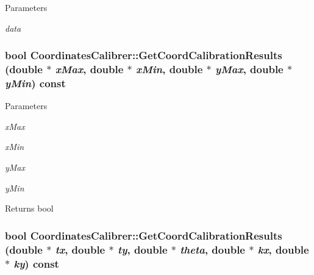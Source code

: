 \begin{DoxyParams}{Parameters}
\item[{\em data}]\end{DoxyParams}
\hypertarget{classCoordinatesCalibrer_a1a3ae703556c2f4c4455792a43fed987}{
\subsubsection[{GetCoordCalibrationResults}]{\setlength{\rightskip}{0pt plus 5cm}bool CoordinatesCalibrer::GetCoordCalibrationResults (double $\ast$ {\em xMax}, \/  double $\ast$ {\em xMin}, \/  double $\ast$ {\em yMax}, \/  double $\ast$ {\em yMin}) const}}
\label{classCoordinatesCalibrer_a1a3ae703556c2f4c4455792a43fed987}

\begin{DoxyParams}{Parameters}
\item[{\em xMax}]\item[{\em xMin}]\item[{\em yMax}]\item[{\em yMin}]\end{DoxyParams}
\begin{DoxyReturn}{Returns}
bool 
\end{DoxyReturn}
\hypertarget{classCoordinatesCalibrer_a92672252bda26bddd9b8c73bc6395ea3}{
\subsubsection[{GetCoordCalibrationResults}]{\setlength{\rightskip}{0pt plus 5cm}bool CoordinatesCalibrer::GetCoordCalibrationResults (double $\ast$ {\em tx}, \/  double $\ast$ {\em ty}, \/  double $\ast$ {\em theta}, \/  double $\ast$ {\em kx}, \/  double $\ast$ {\em ky}) const}}
\label{classCoordinatesCalibrer_a92672252bda26bddd9b8c73bc6395ea3}

